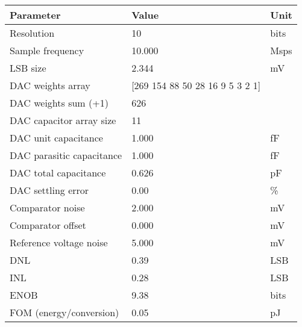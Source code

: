 \begin{tabular}{lll}
\toprule
Parameter & Value & Unit \\
\midrule
Resolution & 10 & bits \\
Sample frequency & 10.000 & Msps \\
LSB size & 2.344 & mV \\
DAC weights array & [269 154  88  50  28  16   9   5   3   2   1] &  \\
DAC weights sum (+1) & 626 &  \\
DAC capacitor array size & 11 &  \\
DAC unit capacitance & 1.000 & fF \\
DAC parasitic capacitance & 1.000 & fF \\
DAC total capacitance & 0.626 & pF \\
DAC settling error & 0.00 & \% \\
Comparator noise & 2.000 & mV \\
Comparator offset & 0.000 & mV \\
Reference voltage noise & 5.000 & mV \\
DNL & 0.39 & LSB \\
INL & 0.28 & LSB \\
ENOB & 9.38 & bits \\
FOM (energy/conversion) & 0.05 & pJ \\
\bottomrule
\end{tabular}
